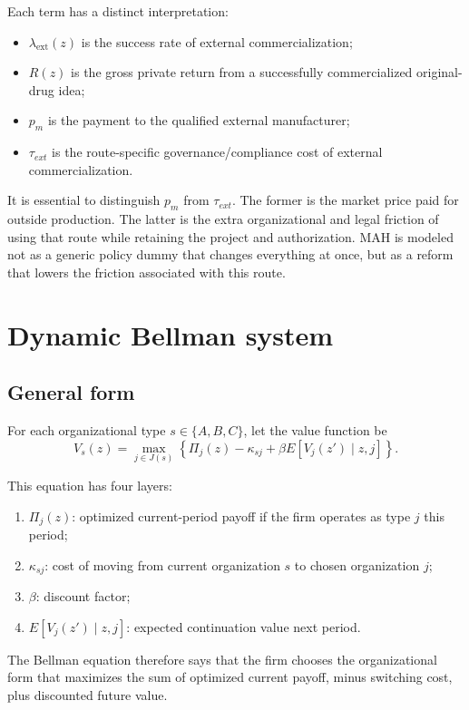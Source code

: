 \documentclass[12pt]{article}
\begin{document}
Each term has a distinct interpretation:

\begin{itemize}[leftmargin=2em]
    \item $\lambda_{\mathrm{ext}}(z)$ is the success rate of external commercialization;
    \item $R(z)$ is the gross private return from a successfully commercialized original-drug idea;
    \item $p_m$ is the payment to the qualified external manufacturer;
    \item $\tau_{ext}$ is the route-specific governance/compliance cost of external commercialization.
\end{itemize}

It is essential to distinguish $p_m$ from $\tau_{ext}$. The former is the market price
paid for outside production. The latter is the extra organizational and legal friction of
using that route while retaining the project and authorization. MAH is modeled not as
a generic policy dummy that changes everything at once, but as a reform that lowers
the friction associated with this route.

\section{Dynamic Bellman system}

\subsection{General form}

For each organizational type $s\in\{A,B,C\}$, let the value function be
\[
V_s(z)=
\max_{j\in J(s)}
\left\{
\Pi_j(z)-\kappa_{sj}
+\beta E[V_j(z')\mid z,j]
\right\}.
\]

This equation has four layers:

\begin{enumerate}[leftmargin=2em]
    \item \(\Pi_j(z)\): optimized current-period payoff if the firm operates as type \(j\) this period;
    \item \(\kappa_{sj}\): cost of moving from current organization \(s\) to chosen organization \(j\);
    \item \(\beta\): discount factor;
    \item \(E[V_j(z')\mid z,j]\): expected continuation value next period.
\end{enumerate}

The Bellman equation therefore says that the firm chooses the organizational form
that maximizes the sum of optimized current payoff, minus switching cost, plus discounted
future value.
\end{document}
